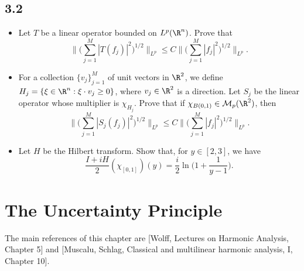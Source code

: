 \subsection*{3.2}
\begin{itemize}
    \item[1.]Let $T$ be a linear operator bounded on $L^p(\R^n)$. Prove that
    $$\Big\|\Big(\sum_{j=1}^M|T(f_j)|^2\Big)^{1/2}\Big\|_{L^p}
    \le C\Big\|\Big(\sum_{j=1}^M|f_j|^2\Big)^{1/2}\Big\|_{L^p}.$$

    \item[2.]For a collection $\{v_j\}_{j=1}^M$ of unit vectors in $\R^2$, 
    we define $H_j=\{\xi\in\R^n:\xi\cdot v_j\ge0\}$, where $v_j\in\R^2$ 
    is a direction. Let $S_j$ be the linear operator whose multiplier is $\chi_{H_j}$. 
    Prove that if $\chi_{B(0,1)}\in\mathcal{M}_p(\R^2)$, then
    $$\Big\|\Big(\sum_{j=1}^M|S_j(f_j)|^2\Big)^{1/2}\Big\|_{L^p}
    \le C\Big\|\Big(\sum_{j=1}^M|f_j|^2\Big)^{1/2}\Big\|_{L^p}.$$

    \item[3.]Let $H$ be the Hilbert transform. Show that, for $y\in[2,3]$, we have 
    $$\frac{I+iH}{2}(\chi_{[0,1]})(y)=\frac{i}{2}\ln\Big(1+\frac{1}{y-1}\Big).$$
\end{itemize}


\section{The Uncertainty Principle}
The main references of this chapter are [Wolff, Lectures on Harmonic Analysis,
Chapter 5] and [Muscalu, Schlag, Classical and multilinear harmonic analysis, I,
Chapter 10].

